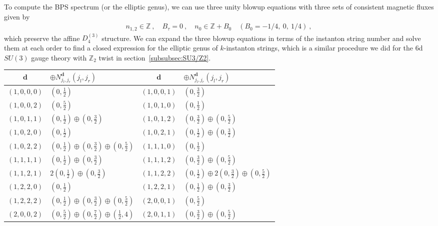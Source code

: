 To compute the BPS spectrum (or the elliptic genus), we can use three unity blowup equations with three sets of consistent magnetic fluxes given by
\begin{align}
n_{1, 2} \in \mathbb{Z} \ , \quad
B_\tau = 0 \ , \quad
n_0 \in \mathbb{Z} + B_0 \quad (B_0 = -1/4,\ 0,\ 1/4) \ ,
\end{align}
which preserve the affine $ D_4^{(3)} $ structure. We can expand the three blowup equations in terms of the instanton string number and solve them at each order to find a closed expression for the elliptic genus of $k$-instanton strings, which is a similar procedure we did for the 6d $ SU(3) $ gauge theory with $ \mathbb{Z}_2 $ twist in section~\ref{subsubsec:SU3/Z2}.
\begin{table}
	\centering
	\begin{tabular}{|c|C{25ex}||c|C{25ex}|} \hline
		$\mathbf{d}$ & $\oplus N_{j_l, j_r}^{\mathbf{d}} (j_l, j_r)$ & $\mathbf{d}$ & $\oplus N_{j_l, j_r}^{\mathbf{d}} (j_l, j_r)$ \\ \hline
		$ (1, 0, 0, 0) $ & $ (0, \frac{1}{2}) $ & $ (1, 0, 0, 1) $ & $ (0, \frac{3}{2}) $ \\ \hline
		$ (1, 0, 0, 2) $ & $ (0, \frac{5}{2}) $ & $ (1, 0, 1, 0) $ & $ (0, \frac{1}{2}) $ \\ \hline
		$ (1, 0, 1, 1) $ & $ (0, \frac{1}{2}) \oplus (0, \frac{3}{2}) $ & $ (1, 0, 1, 2) $ & $ (0, \frac{3}{2}) \oplus (0, \frac{5}{2}) $ \\ \hline
		$ (1, 0, 2, 0) $ & $ (0, \frac{1}{2}) $ & $ (1, 0, 2, 1) $ & $ (0, \frac{1}{2}) \oplus (0, \frac{3}{2}) $ \\ \hline
		$ (1, 0, 2, 2) $ & $ (0, \frac{1}{2}) \oplus (0, \frac{3}{2}) \oplus (0, \frac{5}{2}) $ & $ (1, 1, 1, 0) $ & $ (0, \frac{1}{2}) $ \\ \hline
		$ (1, 1, 1, 1) $ & $ (0, \frac{1}{2}) \oplus (0, \frac{3}{2}) $ & $ (1, 1, 1, 2) $ & $ (0, \frac{3}{2}) \oplus (0, \frac{5}{2}) $ \\ \hline
		$ (1, 1, 2, 1) $ & $ 2(0, \frac{1}{2}) \oplus (0, \frac{3}{2}) $ & $ (1, 1, 2, 2) $ & $ (0, \frac{1}{2}) \oplus 2(0, \frac{3}{2}) \oplus (0, \frac{5}{2}) $ \\ \hline
		$ (1, 2, 2, 0) $ & $ (0, \frac{1}{2}) $ & $ (1, 2, 2, 1) $ & $ (0, \frac{1}{2}) \oplus (0, \frac{3}{2}) $ \\ \hline
		$ (1, 2, 2, 2) $ & $ (0, \frac{1}{2}) \oplus (0, \frac{3}{2}) \oplus (0, \frac{5}{2}) $ & $ (2, 0, 0, 1) $ & $ (0, \frac{5}{2}) $ \\ \hline
		$ (2, 0, 0, 2) $ & $ (0, \frac{5}{2}) \oplus (0, \frac{7}{2}) \oplus (\frac{1}{2}, 4) $ & $ (2, 0, 1, 1) $ & $ (0, \frac{3}{2}) \oplus (0, \frac{5}{2}) $ \\ \hline

\end{tabular}
\end{table}
